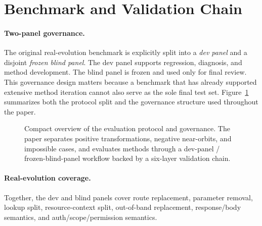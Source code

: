 \section{Benchmark and Validation Chain}
\label{sec:benchmark}

\paragraph{Two-panel governance.}
The original real-evolution benchmark is explicitly split into a \emph{dev panel} and a disjoint \emph{frozen blind panel}. The dev panel supports regression, diagnosis, and method development. The blind panel is frozen and used only for final review. This governance design matters because a benchmark that has already supported extensive method iteration cannot also serve as the sole final test set. Figure~\ref{fig:protocol-governance} summarizes both the protocol split and the governance structure used throughout the paper.

\begin{figure}[t]
\centering
\footnotesize
\setlength{\fboxsep}{6pt}

\vspace{0.5em}

\caption{Compact overview of the evaluation protocol and governance. The paper separates positive transformations, negative near-orbits, and impossible cases, and evaluates methods through a dev-panel / frozen-blind-panel workflow backed by a six-layer validation chain.}
\label{fig:protocol-governance}
\end{figure}

\paragraph{Real-evolution coverage.}
Together, the dev and blind panels cover route replacement, parameter removal, lookup split, resource-context split, out-of-band replacement, response/body semantics, and auth/scope/permission semantics.

